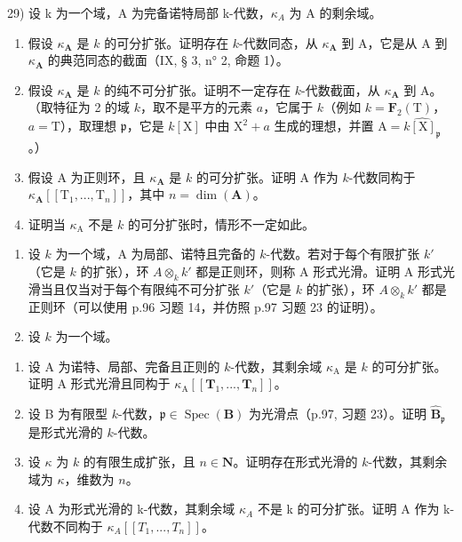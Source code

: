 29) 设 k 为一个域，A 为完备诺特局部 k-代数，\(\kappa_{A}\) 为 A 的剩余域。

\begin{enumerate}
\def\labelenumi{\alph{enumi})}
\item
  假设 \(\kappa_{\mathbf{A}}\) 是 \(k\) 的可分扩张。证明存在 \(k\)-代数同态，从 \(\kappa_{\mathbf{A}}\) 到 A，它是从 A 到 \(\kappa_{\mathbf{A}}\) 的典范同态的截面（IX, § 3, n° 2, 命题 1）。
\item
  假设 \(\kappa_{\mathbf{A}}\) 是 \(k\) 的纯不可分扩张。证明不一定存在 \(k\)-代数截面，从 \(\kappa_{\mathbf{A}}\) 到 A。（取特征为 2 的域 \(k\)，取不是平方的元素 \(a\)，它属于 \(k\)（例如 \(k = \mathbf{F}_2(\mathrm{T})\)，\(a = \mathrm{T}\)），取理想 \(\mathfrak{p}\)，它是 \(k[\mathrm{X}]\) 中由 \(\mathrm{X}^2 + a\) 生成的理想，并置 \(\mathrm{A} = \widehat{k[\mathrm{X}]_{\mathfrak{p}}}\)。）
\item
  假设 A 为正则环，且 \(\kappa_{\mathbf{A}}\) 是 \(k\) 的可分扩张。证明 A 作为 \(k\)-代数同构于 \(\kappa_{\mathbf{A}}[[\mathrm{T}_{1}, ..., \mathrm{T}_{n}]]\)，其中 \(n = \dim(\mathbf{A})\)。
\item
  证明当 \(\kappa_{\mathrm{A}}\) 不是 \(k\) 的可分扩张时，情形不一定如此。
\end{enumerate}

\begin{enumerate}
\def\labelenumi{\arabic{enumi})}
\setcounter{enumi}{29}
\item
  设 \(k\) 为一个域，A 为局部、诺特且完备的 \(k\)-代数。若对于每个有限扩张 \(k'\)（它是 \(k\) 的扩张），环 \(A \otimes_k k'\) 都是正则环，则称 A 形式光滑。证明 A 形式光滑当且仅当对于每个有限纯不可分扩张 \(k'\)（它是 \(k\) 的扩张），环 \(A \otimes_k k'\) 都是正则环（可以使用 p.96 习题 14，并仿照 p.97 习题 23 的证明）。
\item
  设 \(k\) 为一个域。
\end{enumerate}

\begin{enumerate}
\def\labelenumi{\alph{enumi})}
\item
  设 A 为诺特、局部、完备且正则的 \(k\)-代数，其剩余域 \(\kappa_{\mathrm{A}}\) 是 \(k\) 的可分扩张。证明 A 形式光滑且同构于 \(\kappa_{\mathrm{A}}[[\mathbf{T}_{1}, ..., \mathbf{T}_{n}]]\)。
\item
  设 B 为有限型 \(k\)-代数，\(\mathfrak{p} \in \operatorname{Spec}(\mathbf{B})\) 为光滑点（p.97, 习题 23）。证明 \(\hat{\mathbf{B}}_{\mathfrak{p}}\) 是形式光滑的 \(k\)-代数。
\item
  设 \(\kappa\) 为 \(k\) 的有限生成扩张，且 \(n\in\mathbf{N}\)。证明存在形式光滑的 \(k\)-代数，其剩余域为 \(\kappa\)，维数为 \(n\)。
\item
  设 A 为形式光滑的 k-代数，其剩余域 \(\kappa_{A}\) 不是 k 的可分扩张。证明 A 作为 k-代数不同构于 \(\kappa_{A}[[T_{1},...,T_{n}]]\)。
\end{enumerate}

